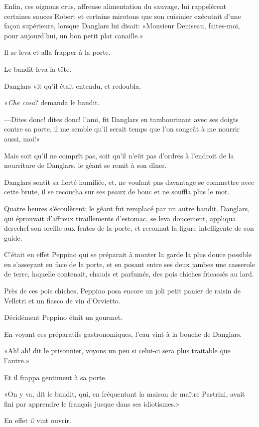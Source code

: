 Enfin, ces oignons crus, affreuse alimentation du sauvage, lui rappelèrent certaines sauces Robert et certains mirotons que son cuisinier exécutait d'une façon supérieure, lorsque Danglars lui disait: «Monsieur Deniseau, faites-moi, pour aujourd'hui, un bon petit plat canaille.» 

Il se leva et alla frapper à la porte. 

Le bandit leva la tête. 

Danglars vit qu'il était entendu, et redoubla. 

«\textit{Che cosa}? demanda le bandit. 

—Dites donc! dites donc! l'ami, fit Danglars en tambourinant avec ses doigts contre sa porte, il me semble qu'il serait temps que l'on songeât à me nourrir aussi, moi!» 

Mais soit qu'il ne comprît pas, soit qu'il n'eût pas d'ordres à l'endroit de la nourriture de Danglars, le géant se remit à son dîner. 

Danglars sentit sa fierté humiliée, et, ne voulant pas davantage se commettre avec cette brute, il se recoucha sur ses peaux de bouc et ne souffla plus le mot. 

Quatre heures s'écoulèrent; le géant fut remplacé par un autre bandit. Danglars, qui éprouvait d'affreux tiraillements d'estomac, se leva doucement, appliqua derechef son oreille aux fentes de la porte, et reconnut la figure intelligente de son guide. 

C'était en effet Peppino qui se préparait à monter la garde la plus douce possible en s'asseyant en face de la porte, et en posant entre ses deux jambes une casserole de terre, laquelle contenait, chauds et parfumés, des pois chiches fricassés au lard. 

Près de ces pois chiches, Peppino posa encore un joli petit panier de raisin de Velletri et un fiasco de vin d'Orvietto. 

Décidément Peppino était un gourmet. 

En voyant ces préparatifs gastronomiques, l'eau vint à la bouche de Danglars. 

«Ah! ah! dit le prisonnier, voyons un peu si celui-ci sera plus traitable que l'autre.» 

Et il frappa gentiment à sa porte. 

«On y va, dit le bandit, qui, en fréquentant la maison de maître Pastrini, avait fini par apprendre le français jusque dans ses idiotismes.» 

En effet il vint ouvrir. 

